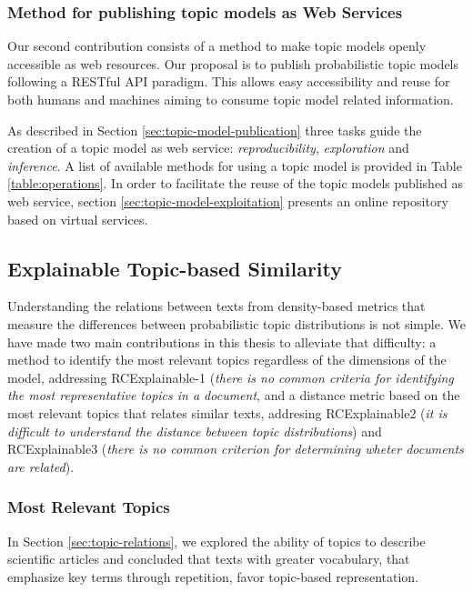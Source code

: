 \subsubsection{Method for publishing topic models as Web Services}

Our second contribution consists of a method to make topic models openly accessible as web resources. Our proposal is to publish probabilistic topic models following a RESTful API paradigm. This allows easy accessibility and reuse for both humans and machines aiming to consume topic model related information.

As described in Section \ref{sec:topic-model-publication} three tasks guide the creation of a topic model as web service: \textit{reproducibility}, \textit{exploration} and \textit{inference}. A list of available methods for using a topic model is provided in Table \ref{table:operations}. In order to facilitate the reuse of the topic models published as web service, section \ref{sec:topic-model-exploitation} presents an online repository based on virtual services.

\subsection{Explainable Topic-based Similarity}

Understanding the relations between texts from density-based metrics that measure the differences between probabilistic topic distributions is not simple. We have made two main contributions in this thesis to alleviate that difficulty: a method to identify the most relevant topics regardless of the dimensions of the model, addressing RCExplainable-1 (\textit{there is no common criteria for identifying the most representative topics in a document}, and a distance metric based on the most relevant topics that relates similar texts, addresing RCExplainable2 (\textit{it is difficult to understand the distance between topic distributions}) and RCExplainable3 (\textit{there is no common criterion for determining wheter documents are related}).

\subsubsection{Most Relevant Topics}

In Section \ref{sec:topic-relations}, we explored the ability of topics to describe scientific articles and concluded that texts with greater vocabulary, that emphasize key terms through repetition, favor topic-based representation. 

